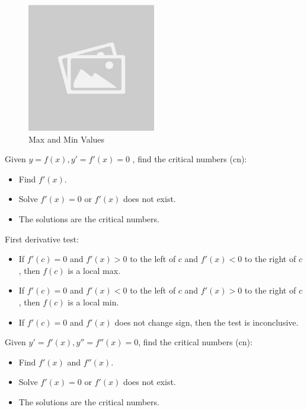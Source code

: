 \documentclass{article}
\begin{document}
\begin{illustrationbox}
    \begin{figure}[H]
        \centering
        \includegraphics[width=0.5\textwidth]{sample_image.jpg}
        \caption{Max and Min Values}
    \end{figure}
\end{illustrationbox}

Given \( y = f(x), y' = f'(x) = 0 \) , find the critical numbers (cn):
\begin{itemize}
    \item Find \( f'(x) \).
    \item Solve \( f'(x) = 0 \) or \( f'(x) \) does not exist.
    \item The solutions are the critical numbers.
\end{itemize}

\begin{notebox}
    First derivative test:
    \begin{itemize}
        \item If \( f'(c) = 0 \) and \( f'(x) > 0 \) to the left of \( c \) and \( f'(x) < 0 \) to the right of \( c \), then \( f(c) \) is a local max.
        \item If \( f'(c) = 0 \) and \( f'(x) < 0 \) to the left of \( c \) and \( f'(x) > 0 \) to the right of \( c \), then \( f(c) \) is a local min.
        \item If \( f'(c) = 0 \) and \( f'(x) \) does not change sign, then the test is inconclusive.
    \end{itemize}
\end{notebox}

Given \( y' = f'(x), y'' = f''(x) = 0 \), find the critical  numbers (cn):
\begin{itemize}
    \item Find \( f'(x) \) and \( f''(x) \).
    \item Solve \( f'(x) = 0 \) or \( f'(x) \) does not exist.
    \item The solutions are the critical numbers.
\end{itemize}
\end{document}
